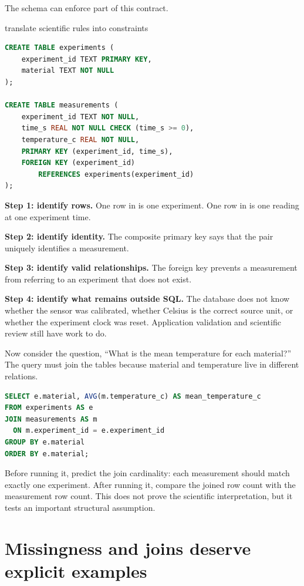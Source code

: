 The schema can enforce part of this contract.

\begin{workedexample}{translate scientific rules into constraints}
\begin{lstlisting}[language=SQL]
CREATE TABLE experiments (
    experiment_id TEXT PRIMARY KEY,
    material TEXT NOT NULL
);

CREATE TABLE measurements (
    experiment_id TEXT NOT NULL,
    time_s REAL NOT NULL CHECK (time_s >= 0),
    temperature_c REAL NOT NULL,
    PRIMARY KEY (experiment_id, time_s),
    FOREIGN KEY (experiment_id)
        REFERENCES experiments(experiment_id)
);
\end{lstlisting}

\textbf{Step 1: identify rows.} One row in  is one
experiment. One row in  is one reading at one experiment
time.

\textbf{Step 2: identify identity.} The composite primary key says that the
pair  uniquely identifies a measurement.

\textbf{Step 3: identify valid relationships.} The foreign key prevents a
measurement from referring to an experiment that does not exist.

\textbf{Step 4: identify what remains outside SQL.} The database does not know
whether the sensor was calibrated, whether Celsius is the correct source unit,
or whether the experiment clock was reset. Application validation and
scientific review still have work to do.
\end{workedexample}

Now consider the question, ``What is the mean temperature for each material?''
The query must join the tables because material and temperature live in
different relations.

\begin{lstlisting}[language=SQL]
SELECT e.material, AVG(m.temperature_c) AS mean_temperature_c
FROM experiments AS e
JOIN measurements AS m
  ON m.experiment_id = e.experiment_id
GROUP BY e.material
ORDER BY e.material;
\end{lstlisting}

Before running it, predict the join cardinality: each measurement should match
exactly one experiment. After running it, compare the joined row count with the
measurement row count. This does not prove the scientific interpretation, but
it tests an important structural assumption.

\section{Missingness and joins deserve explicit examples}

